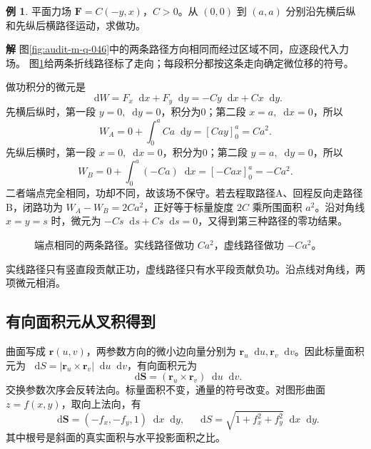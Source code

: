 \documentclass[11pt,openany,fontset=fandol]{ctexbook}
\theoremstyle{plain}\newtheorem{theorem}{定理}[chapter]\newtheorem{proposition}[theorem]{命题}
\theoremstyle{definition}\newtheorem{definition}{定义}[chapter]\newtheorem{example}{例}[chapter]
\theoremstyle{remark}\newtheorem*{remark}{说明}
\newcommand{\SolutionStart}{\par\nobreak\medskip\nobreak\noindent\textbf{解}\quad\ignorespaces}
\newenvironment{solution}{\SolutionStart}{\par\medskip}
\newcommand{\dd}{\mathop{}\!\mathrm d}\newcommand{\ii}{\mathrm i}\newcommand{\ee}{\mathrm e}
\newcommand{\vct}[1]{\bm{#1}}\newcommand{\Rea}{\operatorname{Re}}\newcommand{\Ima}{\operatorname{Im}}
\begin{document}
\begin{example}
平面力场 $\vct F=C(-y,x)$，$C>0$。从 $(0,0)$ 到 $(a,a)$ 分别沿先横后纵和先纵后横路径运动，求做功。
\end{example}

\begin{solution}
图\ref{fig:audit-m-q-046}中的两条路径方向相同而经过区域不同，应逐段代入力场。
图\ref{fig:orig-034}给两条折线路径标了走向；每段积分都按这条走向确定微位移的符号。

做功积分的微元是
\[
\dd W=F_x\dd x+F_y\dd y=-Cy\dd x+Cx\dd y.
\]
先横后纵时，第一段 $y=0,\dd y=0$，积分为0；第二段 $x=a,\dd x=0$，所以
\[
W_A=0+\int_0^a Ca\dd y=[Cay]_0^a=Ca^2.
\]
先纵后横时，第一段 $x=0,\dd x=0$，积分为0；第二段 $y=a,\dd y=0$，所以
\[
W_B=0+\int_0^a(-Ca)\dd x=[-Cax]_0^a=-Ca^2.
\]
二者端点完全相同，功却不同，故该场不保守。若去程取路径A、回程反向走路径B，闭路功为 $W_A-W_B=2Ca^2$，正好等于标量旋度 $2C$ 乘所围面积 $a^2$。沿对角线 $x=y=s$ 时，微元为 $-Cs\dd s+Cs\dd s=0$，又得到第三种路径的零功结果。

\begin{figure}[H]\centering
{}
\caption{端点相同的两条路径。实线路径做功 $Ca^2$，虚线路径做功 $-Ca^2$。}
\label{fig:orig-034}
\end{figure}

实线路径只有竖直段贡献正功，虚线路径只有水平段贡献负功。沿点线对角线，两项微元相消。
\end{solution}

\subsection{有向面积元从叉积得到}
曲面写成 $\vct r(u,v)$，两参数方向的微小边向量分别为 $\vct r_u\dd u,\vct r_v\dd v$。因此标量面积元为 $\dd S=|\vct r_u\times\vct r_v|\dd u\dd v$，有向面积元为
\[
\dd\vct S=(\vct r_u\times\vct r_v)\dd u\dd v.
\]
交换参数次序会反转法向。标量面积不变，通量的符号改变。对图形曲面 $z=f(x,y)$，取向上法向，有
\[
\dd\vct S=(-f_x,-f_y,1)\dd x\dd y,
\quad \dd S=\sqrt{1+f_x^2+f_y^2}\dd x\dd y.
\]
其中根号是斜面的真实面积与水平投影面积之比。
\end{document}
